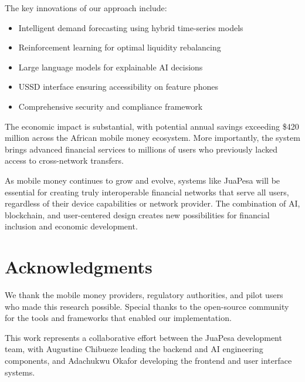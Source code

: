 \documentclass[11pt,a4paper]{article}
\begin{document}
The key innovations of our approach include:
\begin{itemize}
    \item Intelligent demand forecasting using hybrid time-series models
    \item Reinforcement learning for optimal liquidity rebalancing
    \item Large language models for explainable AI decisions
    \item USSD interface ensuring accessibility on feature phones
    \item Comprehensive security and compliance framework
\end{itemize}

The economic impact is substantial, with potential annual savings exceeding \$420 million across the African mobile money ecosystem. More importantly, the system brings advanced financial services to millions of users who previously lacked access to cross-network transfers.

As mobile money continues to grow and evolve, systems like JuaPesa will be essential for creating truly interoperable financial networks that serve all users, regardless of their device capabilities or network provider. The combination of AI, blockchain, and user-centered design creates new possibilities for financial inclusion and economic development.

\section*{Acknowledgments}

We thank the mobile money providers, regulatory authorities, and pilot users who made this research possible. Special thanks to the open-source community for the tools and frameworks that enabled our implementation.

This work represents a collaborative effort between the JuaPesa development team, with Augustine Chibueze leading the backend and AI engineering components, and Adachukwu Okafor developing the frontend and user interface systems.



\end{document}
